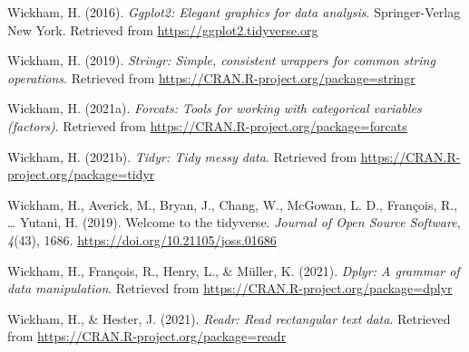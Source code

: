 \documentclass[
  english,
  man,floatsintext]{apa6}
\begin{document}
\leavevmode\hypertarget{ref-R-ggplot2}{}%
Wickham, H. (2016). \emph{Ggplot2: Elegant graphics for data analysis}. Springer-Verlag New York. Retrieved from \url{https://ggplot2.tidyverse.org}

\leavevmode\hypertarget{ref-R-stringr}{}%
Wickham, H. (2019). \emph{Stringr: Simple, consistent wrappers for common string operations}. Retrieved from \url{https://CRAN.R-project.org/package=stringr}

\leavevmode\hypertarget{ref-R-forcats}{}%
Wickham, H. (2021a). \emph{Forcats: Tools for working with categorical variables (factors)}. Retrieved from \url{https://CRAN.R-project.org/package=forcats}

\leavevmode\hypertarget{ref-R-tidyr}{}%
Wickham, H. (2021b). \emph{Tidyr: Tidy messy data}. Retrieved from \url{https://CRAN.R-project.org/package=tidyr}

\leavevmode\hypertarget{ref-R-tidyverse}{}%
Wickham, H., Averick, M., Bryan, J., Chang, W., McGowan, L. D., François, R., \ldots{} Yutani, H. (2019). Welcome to the tidyverse. \emph{Journal of Open Source Software}, \emph{4}(43), 1686. \url{https://doi.org/10.21105/joss.01686}

\leavevmode\hypertarget{ref-R-dplyr}{}%
Wickham, H., François, R., Henry, L., \& Müller, K. (2021). \emph{Dplyr: A grammar of data manipulation}. Retrieved from \url{https://CRAN.R-project.org/package=dplyr}

\leavevmode\hypertarget{ref-R-readr}{}%
Wickham, H., \& Hester, J. (2021). \emph{Readr: Read rectangular text data}. Retrieved from \url{https://CRAN.R-project.org/package=readr}

\endgroup
\end{document}
